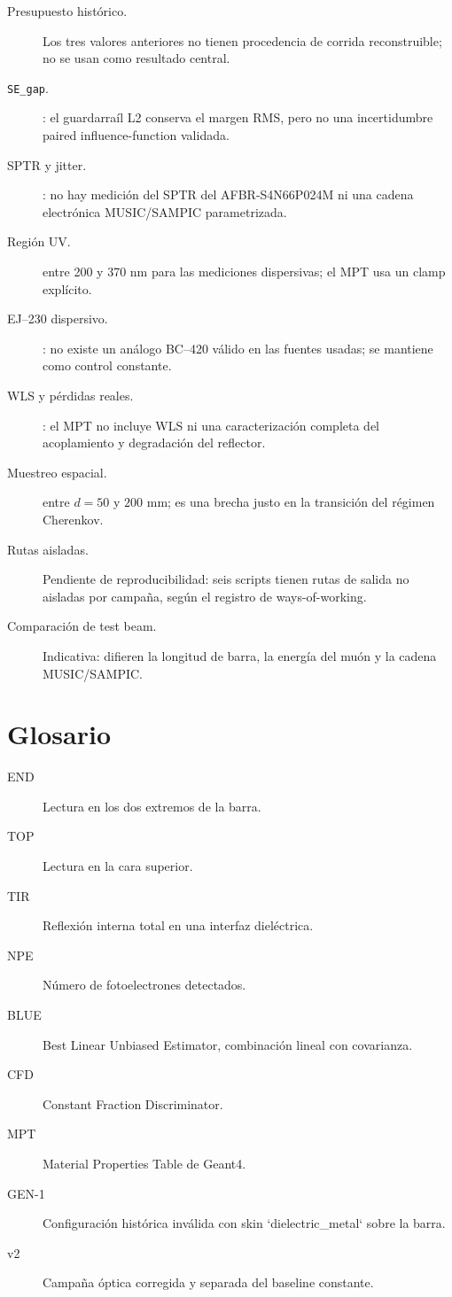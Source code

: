 \begin{description}
\item[Presupuesto histórico.] Los tres valores anteriores no tienen procedencia de corrida reconstruible; no se usan como resultado central.
\item[\texttt{SE\_gap}.] \NOTAVAILABLE: el guardarraíl L2 conserva el margen RMS, pero no una incertidumbre paired influence-function validada.
\item[SPTR y jitter.] \NOTAVAILABLE: no hay medición del SPTR del AFBR-S4N66P024M ni una cadena electrónica MUSIC/SAMPIC parametrizada.
\item[Región UV.] \NOTAVAILABLE entre 200 y 370 nm para las mediciones dispersivas; el MPT usa un clamp explícito.
\item[EJ--230 dispersivo.] \NOTAVAILABLE: no existe un análogo BC--420 válido en las fuentes usadas; se mantiene como control constante.
\item[WLS y pérdidas reales.] \NOTAVAILABLE: el MPT no incluye WLS ni una caracterización completa del acoplamiento y degradación del reflector.
\item[Muestreo espacial.] \NOTAVAILABLE entre $d=50$ y $200$ mm; es una brecha justo en la transición del régimen Cherenkov.
\item[Rutas aisladas.] Pendiente de reproducibilidad: seis scripts tienen rutas de salida no aisladas por campaña, según el registro de ways-of-working.
\item[Comparación de test beam.] Indicativa: difieren la longitud de barra, la energía del muón y la cadena MUSIC/SAMPIC.
\end{description}

\chapter{Glosario}
\begin{description}
\item[END] Lectura en los dos extremos de la barra.
\item[TOP] Lectura en la cara superior.
\item[TIR] Reflexión interna total en una interfaz dieléctrica.
\item[NPE] Número de fotoelectrones detectados.
\item[BLUE] Best Linear Unbiased Estimator, combinación lineal con covarianza.
\item[CFD] Constant Fraction Discriminator.
\item[MPT] Material Properties Table de Geant4.
\item[GEN-1] Configuración histórica inválida con skin `dielectric\_metal` sobre la barra.
\item[v2] Campaña óptica corregida y separada del baseline constante.
\end{description}
